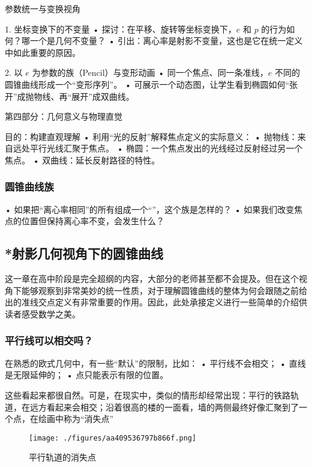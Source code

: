 参数统一与变换视角

1. 坐标变换下的不变量
	•	探讨：在平移、旋转等坐标变换下，$e$ 和 $p$ 的行为如何？哪一个是几何不变量？
	•	引出：离心率是射影不变量，这也是它在统一定义中如此重要的原因。

2. 以 $e$ 为参数的族（Pencil）与变形动画
	•	同一个焦点、同一条准线，$e$ 不同的圆锥曲线形成一个“变形序列”。
	•	可展示一个动态图，让学生看到椭圆如何“张开”成抛物线、再“展开”成双曲线。



第四部分：几何意义与物理直觉

目的：构建直观理解
	•	利用“光的反射”解释焦点定义的实际意义：
	•	抛物线：来自远处平行光线汇聚于焦点。
	•	椭圆：一个焦点发出的光线经过反射经过另一个焦点。
	•	双曲线：延长反射路径的特性。



\subsubsection{圆锥曲线族}

	•	如果把“离心率相同”的所有组成一个“”，这个族是怎样的？
	•	如果我们改变焦点的位置但保持离心率不变，会发生什么？

\subsection{*射影几何视角下的圆锥曲线}\label{sub_HsCsFD_1}

这一章在高中阶段是完全超纲的内容，大部分的老师甚至都不会提及。但在这个视角下能够观察到非常美妙的统一性质，对于理解圆锥曲线的整体为何会跟随之前给出的准线交点定义有非常重要的作用。因此，此处承接定义进行一些简单的介绍供读者感受数学之美。

\subsubsection{平行线可以相交吗？}

在熟悉的欧式几何中，有一些“默认”的限制，比如：
	•	平行线不会相交；
	•	直线是无限延伸的；
	•	点只能表示有限的位置。

这些看起来都很自然。可是，在现实中，类似的情形却经常出现：平行的铁路轨道，在远方看起来会相交；沿着很高的楼的一面看，墙的两侧最终好像汇聚到了一个点，在绘画中称为“消失点”

\begin{figure}[ht]
\centering
\texttt{[image: ./figures/aa409536797b866f.png]}
\caption{平行轨道的消失点} \label{fig_HsCsFD_2}
\end{figure}

